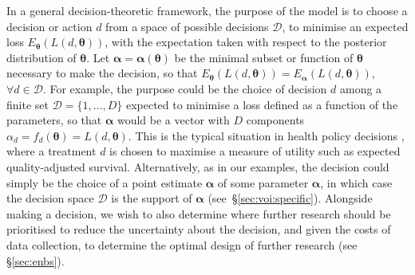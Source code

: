 \documentclass[12pt]{article}\usepackage[]{graphicx}\usepackage[]{color}
\begin{document}
In a general decision-theoretic framework, the purpose of the model is
to choose a decision or action $d$ from a space of possible decisions
$\mathcal{D}$, to minimise an expected loss
$E_{\bm\theta}(L(d,\bm\theta))$, with the expectation taken with
respect to the posterior distribution of $\bm\theta$.  Let
$\bm\alpha = \bm\alpha(\bm\theta)$ be the minimal subset or function
of $\bm\theta$ necessary to make the decision, so that $E_{\bm\theta}(L(d,\bm\theta)) = E_{\bm\alpha}(L(d,\bm\theta))$, $\forall d \in \mathcal{D}$.  For example, the purpose could be the choice of decision $d$ among a
finite set $\mathcal{D}=\{1,\ldots,D\}$ expected to minimise a loss
defined as a function of the parameters, so that $\bm\alpha$ would be
a vector with $D$ components $\alpha_d = f_d(\bm\theta) = L(d,\bm\theta)$. 
This is the typical situation in health
policy decisions \citep[e.g.][]{claxton2006using}, where a treatment $d$
is chosen to maximise a measure of utility such as expected
quality-adjusted survival.  Alternatively, as in our examples, 
the decision could simply
be the choice of a point estimate $\hat{\bm\alpha}$ of some parameter
$\bm\alpha$, in which case the decision space $\mathcal{D}$ is the
support of $\bm\alpha$ (see~\S\ref{sec:voi:specific}).
Alongside making a decision, we wish to also determine where further 
research should be prioritised to reduce the uncertainty about the decision, and
given the costs of data collection, to determine the optimal design of 
further research (see \S\ref{sec:enbs}).  

\end{document}
